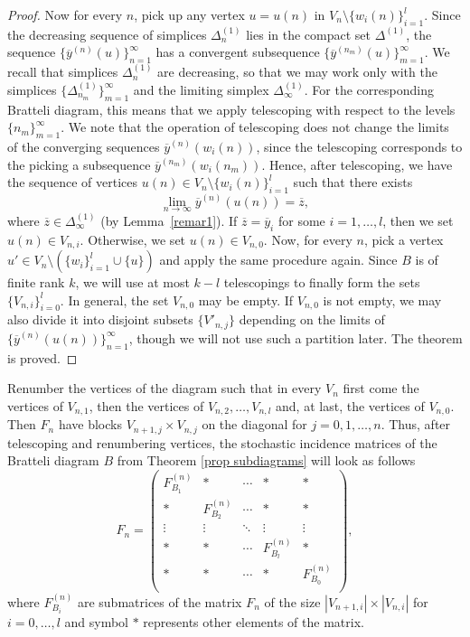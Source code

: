 \documentclass[11pt, english, reqno]{amsart}
\theoremstyle{definition}
\theoremstyle{remark}
\theoremstyle{plain}
\def\ov{\overline}
\numberwithin{equation}{section}
\begin{document}
{\begin{proof}
Now for every $n$, pick up any vertex $u = u(n)$ in $V_n \setminus 
\{w_i(n)\}_{i=1}^l$.
Since the decreasing sequence of simplices $\Delta_{n}^{(1)}$ lies in the
compact set $\Delta^{(1)}$, the sequence $\{\ov y^{(n)}(u)\}_{n = 1}
^{\infty}$ has a convergent subsequence $\{\ov y^{(n_m)}(u)\}_{m = 1}
^{\infty}$. We recall that simplices $\Delta_n^{(1)}$ are decreasing,
so that we may work only with the simplices
$\{\Delta_{n_m}^{(1)}\}_{m = 1}^\infty$ and the limiting simplex
$\Delta_\infty^{(1)}$. For the corresponding Bratteli diagram, this means
that we apply telescoping with respect to the levels $\{n_m\}_{m=1}^\infty$. 
We note that the operation of telescoping does not change the limits of the
 converging sequences $\ov y^{(n)}(w_i(n))$, since the telescoping 
 corresponds to the picking a subsequence $\ov y^{(n_m)}(w_i(n_m))$.
Hence, after telescoping, we have the sequence of vertices $u(n) \in V_n
 \setminus \{w_i(n)\}_{i=1}^l$ such that there exists 
$$
\lim_{n \rightarrow \infty} \ov y^{(n)}(u(n)) = \ov z,
$$
where $\ov z \in \Delta_{\infty}^{(1)}$ (by Lemma~\ref{remar1}). If $\ov z 
= \ov y_i$ for some $i = 1, \ldots, l$, then we set $u(n) \in V_{n,i}$. 
Otherwise, we set $u(n) \in V_{n,0}$.
 Now, for every $n$, pick a vertex $u' \in V_n \setminus (\{w_i\}_{i=1}^l
  \cup \{u\})$ and apply the same procedure again. Since $B$ is of 
 finite rank $k$,
  we will use at most $k - l$ telescopings to finally form the sets $\{V_{n,i}\}_{i = 0}^{l}$. 
In general, the set $V_{n,0}$ may be
 empty. 
If $V_{n,0}$ is not empty, we may also divide it into disjoint subsets 
$\{V'_{n,j}\}$ depending on the limits of 
$\{\ov y^{(n)}(u(n))\}_{n=1}^{\infty}$, though we will not use such a 
partition later. The theorem is proved.
 \end{proof}

Renumber the vertices
   of the diagram such that in every $V_n$ first come the vertices of
$V_{n,1}$, then the vertices of $V_{n,2}, \ldots, V_{n,l}$ and, at last, the
vertices of $V_{n,0}$. Then $F_n$ have blocks $V_{n+1,j} \times
 V_{n,j}$ on the diagonal for $j = 0, 1, \ldots, n$.
Thus, after telescoping and renumbering  vertices, the stochastic incidence
matrices of the Bratteli diagram $B$ from Theorem \ref{prop subdiagrams} will look as follows
\begin{equation}\label{IncidenceMatrixForm}
F_n =\left(
  \begin{array}{ccccccc}
    F^{(n)}_{B_1} & * & \cdots & * & * \\
    * & F^{(n)}_{B_2} & \cdots & * & * \\
    \vdots & \vdots & \ddots & \vdots & \vdots\\
    * & * & \cdots & F^{(n)}_{B_l} & *\\
    * & * & \cdots & * & F^{(n)}_{B_0} \\
  \end{array}
\right),
\end{equation}
where $F^{(n)}_{B_i}$ are submatrices of the matrix $F_n$ of the size
$|V_{n+1,i}| \times |V_{n,i}|$ for $i = 0,\ldots,l$ and symbol $*$
represents  other elements of the matrix.

}
\end{document}
